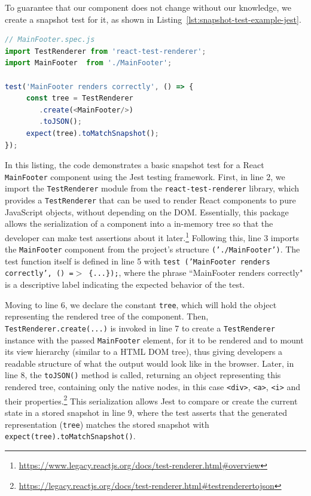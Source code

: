 \documentclass[
	msc, %
	english %
]{../ppgccufmg}
\begin{document}
    To guarantee that our component does not change without our knowledge, we create a snapshot test for it, as shown in Listing~\ref{lst:snapshot-test-example-jest}.

    \begin{lstlisting}[language=javascript, caption= Snapshot test example for a \texttt{MainFooter} component, label=lst:snapshot-test-example-jest]
// MainFooter.spec.js
import TestRenderer from 'react-test-renderer';
import MainFooter  from './MainFooter';

test('MainFooter renders correctly', () => {
     const tree = TestRenderer
        .create(<MainFooter/>)
        .toJSON();
     expect(tree).toMatchSnapshot();
});
    \end{lstlisting} 

In this listing, the code demonstrates a basic snapshot test for a React \texttt{MainFooter} component using the Jest testing framework. First, in line 2, we import the \texttt{TestRenderer} module from the \texttt{react-test-renderer} library, which provides a \texttt{TestRenderer} that can be used to render React components to pure JavaScript objects, without depending on the DOM. Essentially, this package allows the serialization of a component into a in-memory tree so that the developer can make test assertions about it later.\footnote{\url{https://www.legacy.reactjs.org/docs/test-renderer.html\#overview}} Following this, line 3 imports the \texttt{MainFooter} component from the project’s structure \texttt{('./MainFooter')}. The test function itself is defined in line 5 with \texttt{test ('MainFooter renders correctly', () =$>$ \{...\});}, where the phrase ``MainFooter renders correctly" is a descriptive label indicating the expected behavior of the test.

Moving to line 6, we declare the constant \texttt{tree}, which will hold the object representing the rendered tree of the component. Then, \texttt{TestRenderer.create(...)} is invoked in line 7 to create a \texttt{TestRenderer} instance with the passed \texttt{MainFooter} element, for it to be rendered and to mount its view hierarchy (similar to a HTML DOM tree), thus giving developers a readable structure of what the output would look like in the browser. Later, in line 8, the \texttt{toJSON()} method is called, returning an object representing this rendered tree, containing only the native nodes, in this case \texttt{<div>}, \texttt{<a>}, \texttt{<i>} and their properties.\footnote{\url{https://legacy.reactjs.org/docs/test-renderer.html\#testrenderertojson}} This serialization allows Jest to compare or create the current state in a stored snapshot in line 9, where the test asserts that the generated representation (\texttt{tree}) matches the stored snapshot with \texttt{expect(tree).toMatchSnapshot()}.
\end{document}
